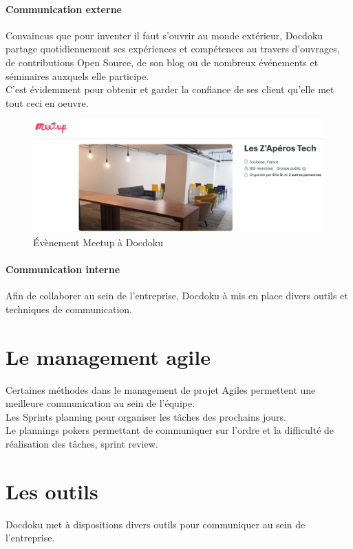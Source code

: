 \documentclass[11pt]{report}
\begin{document}
		\paragraph{Communication externe\\}
			Convaincus que pour inventer il faut s'ouvrir au monde extérieur, Docdoku partage quotidiennement ses expériences et compétences au travers d'ouvrages, de contributions Open Source, de son blog ou de nombreux événements et séminaires auxquels elle participe.\\
			C'est évidemment pour obtenir et garder la confiance de ses client qu'elle met tout ceci en oeuvre.

		\begin{figure}[!htb]
			\includegraphics[scale = 0.4,left]{meetup.png}
			\caption{Évènement Meetup à Docdoku}
		\end{figure}

		\paragraph{Communication interne\\}
			Afin de collaborer au sein de l'entreprise, Docdoku à mis en place divers outils et techniques de communication.

		\section{Le management agile}
			Certaines méthodes dans le management de projet Agiles permettent une meilleure communication au sein de l'équipe. \\
			Les Sprints planning pour organiser les tâches des prochains jours.\\
			Le plannings pokers permettant de communiquer sur l'ordre et la difficulté de réalisation des tâches, sprint review.

		\newpage
		\section{Les outils}
			Docdoku met à dispositions divers outils pour communiquer au sein de l'entreprise.
\end{document}
